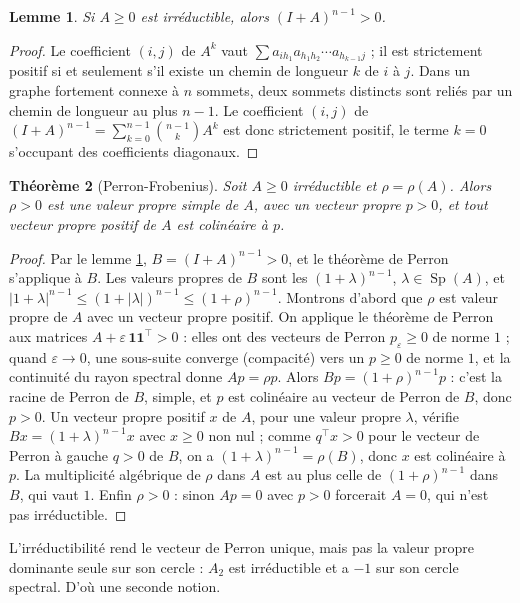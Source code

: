 \documentclass[11pt,a4paper]{article}
\theoremstyle{plain}
\newtheorem{theoreme}{Théorème}[section]
\newtheorem{lemme}[theoreme]{Lemme}
\theoremstyle{definition}
\theoremstyle{remark}
\newcommand{\un}{\mathbf{1}}
\DeclareMathOperator{\Sp}{Sp}
\begin{document}
\begin{lemme}\label{lem:connexe}
Si $A\geq0$ est irréductible, alors $(I+A)^{n-1}>0$.
\end{lemme}

\begin{proof}
Le coefficient $(i,j)$ de $A^k$ vaut $\sum a_{ih_1}a_{h_1h_2}\cdots a_{h_{k-1}j}$ ; il est strictement positif si et seulement s'il existe un chemin de longueur $k$ de $i$ à $j$. Dans un graphe fortement connexe à $n$ sommets, deux sommets distincts sont reliés par un chemin de longueur au plus $n-1$. Le coefficient $(i,j)$ de $(I+A)^{n-1}=\sum_{k=0}^{n-1}\binom{n-1}{k}A^k$ est donc strictement positif, le terme $k=0$ s'occupant des coefficients diagonaux.
\end{proof}

\begin{theoreme}[Perron-Frobenius]\label{thm:pf}
Soit $A\geq0$ irréductible et $\rho=\rho(A)$. Alors $\rho>0$ est une valeur propre simple de $A$, avec un vecteur propre $p>0$, et tout vecteur propre positif de $A$ est colinéaire à $p$.
\end{theoreme}

\begin{proof}
Par le lemme \ref{lem:connexe}, $B=(I+A)^{n-1}>0$, et le théorème de Perron s'applique à $B$. Les valeurs propres de $B$ sont les $(1+\lambda)^{n-1}$, $\lambda\in\Sp(A)$, et $|1+\lambda|^{n-1}\leq(1+|\lambda|)^{n-1}\leq(1+\rho)^{n-1}$. Montrons d'abord que $\rho$ est valeur propre de $A$ avec un vecteur propre positif. On applique le théorème de Perron aux matrices $A+\varepsilon\,\un\un^\top>0$ : elles ont des vecteurs de Perron $p_\varepsilon\geq0$ de norme $1$ ; quand $\varepsilon\to0$, une sous-suite converge (compacité) vers un $p\geq0$ de norme $1$, et la continuité du rayon spectral donne $Ap=\rho p$. Alors $Bp=(1+\rho)^{n-1}p$ : c'est la racine de Perron de $B$, simple, et $p$ est colinéaire au vecteur de Perron de $B$, donc $p>0$. Un vecteur propre positif $x$ de $A$, pour une valeur propre $\lambda$, vérifie $Bx=(1+\lambda)^{n-1}x$ avec $x\geq0$ non nul ; comme $q^\top x>0$ pour le vecteur de Perron à gauche $q>0$ de $B$, on a $(1+\lambda)^{n-1}=\rho(B)$, donc $x$ est colinéaire à $p$. La multiplicité algébrique de $\rho$ dans $A$ est au plus celle de $(1+\rho)^{n-1}$ dans $B$, qui vaut $1$. Enfin $\rho>0$ : sinon $Ap=0$ avec $p>0$ forcerait $A=0$, qui n'est pas irréductible.
\end{proof}

L'irréductibilité rend le vecteur de Perron unique, mais pas la valeur propre dominante seule sur son cercle : $A_2$ est irréductible et a $-1$ sur son cercle spectral. D'où une seconde notion.
\end{document}
